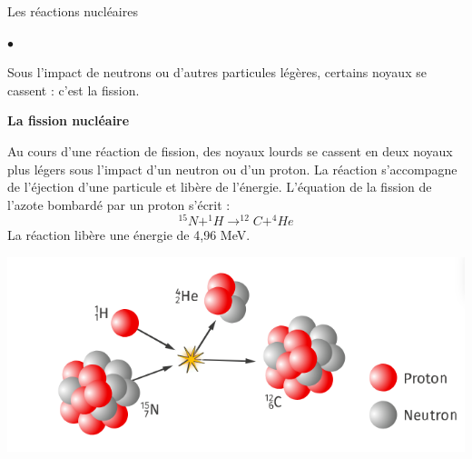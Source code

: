 \documentclass[24pt]{article}
\begin{document}
\begin{concept}{Les réactions nucléaires}
\begin{list}{$\bullet$}{}
        \item Sous l’impact de neutrons ou d’autres particules légères, certains noyaux se
              cassent : c’est la fission.

    \end{list}

    \begin{center}
        \textbf{La fission nucléaire}
    \end{center}

    \begin{minipage}[c]{0.6\textwidth}
        Au cours d’une réaction de fission, des noyaux lourds se cassent en deux noyaux
        plus légers sous l’impact d’un neutron ou d'un proton.
        La réaction s’accompagne de l’éjection d’une particule et libère de l’énergie.
        L’équation de la fission de l’azote bombardé par un proton s’écrit :
        $$^{15}N + ^1H \rightarrow ^{12}C + ^4He$$
        La réaction libère une énergie de 4,96 MeV.
    \end{minipage}
    \begin{minipage}[c]{0.4\textwidth}
        \begin{center}
            \includegraphics[width=\columnwidth]{nuclear2.png}
        \end{center}
    \end{minipage}

\end{concept}



\end{document}
